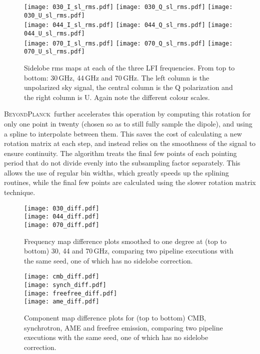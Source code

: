\documentclass[twocolumn]{aa}
\newcommand{\BP}{\textsc{BeyondPlanck}}
\begin{document}
\begin{figure*}[t]
  \center
  \texttt{[image: 030\_I\_sl\_rms.pdf]}
  \texttt{[image: 030\_Q\_sl\_rms.pdf]}
  \texttt{[image: 030\_U\_sl\_rms.pdf]}\\
    \texttt{[image: 044\_I\_sl\_rms.pdf]}
  \texttt{[image: 044\_Q\_sl\_rms.pdf]}
  \texttt{[image: 044\_U\_sl\_rms.pdf]}\\
    \texttt{[image: 070\_I\_sl\_rms.pdf]}
  \texttt{[image: 070\_Q\_sl\_rms.pdf]}
  \texttt{[image: 070\_U\_sl\_rms.pdf]}\\
  \caption{Sidelobe rms maps at each of the three LFI frequencies. From top to bottom: 30\,GHz, 44\,GHz and 70\,GHz. The left column is the unpolarized sky signal, the central column is the Q polarization and the right column is U. Again note the different colour scales.
  }\label{fig:slrms}
\end{figure*}

\BP\ further accelerates this operation by computing this rotation for only one point in twenty (chosen so as to still fully sample the dipole), and using a spline to interpolate between them. This saves the cost of calculating a new rotation matrix at each step, and instead relies on the smoothness of the signal to ensure continuity. The algorithm treats the final few points of each pointing period that do not divide evenly into the subsampling factor separately. This allows the use of regular bin widths, which greatly speeds up the splining routines, while the final few points are calculated using the slower rotation matrix technique. 

\begin{figure}[t]
  \center
  \texttt{[image: 030\_diff.pdf]}\\
  \texttt{[image: 044\_diff.pdf]}\\
  \texttt{[image: 070\_diff.pdf]}
  \caption{Frequency map difference plots smoothed to one degree at (top to bottom) 30, 44 and 70\,GHz, comparing two pipeline executions with the same seed, one of which has no sidelobe correction.
  }\label{fig:freqdiff}
\end{figure}

\begin{figure}[t]
  \center
  \texttt{[image: cmb\_diff.pdf]}\\
  \texttt{[image: synch\_diff.pdf]}\\
  \texttt{[image: freefree\_diff.pdf]}\\
  \texttt{[image: ame\_diff.pdf]}
  \caption{Component map difference plots for (top to bottom) CMB, synchrotron, AME and freefree emission, comparing two pipeline executions with the same seed, one of which has no sidelobe correction.
  }\label{fig:compdiff}
\end{figure}
\end{document}
